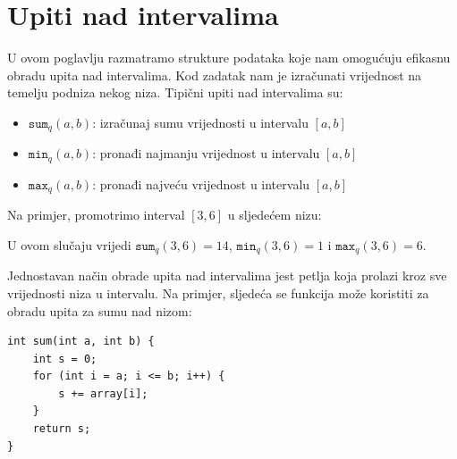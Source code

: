 \chapter{Upiti nad intervalima}


U ovom poglavlju razmatramo strukture podataka
koje nam omogućuju efikasnu obradu upita nad intervalima.
Kod 
zadatak nam je izračunati vrijednost
na temelju podniza nekog niza.
Tipični upiti nad intervalima su:
\begin{itemize}
\item $\texttt{sum}_q(a,b)$: izračunaj sumu vrijednosti u intervalu $[a,b]$
\item $\texttt{min}_q(a,b)$: pronađi najmanju vrijednost u intervalu $[a,b]$
\item $\texttt{max}_q(a,b)$: pronađi najveću vrijednost u intervalu $[a,b]$
\end{itemize}

Na primjer, promotrimo interval $[3,6]$ u sljedećem nizu:
\begin{center}
\end{center}
U ovom slučaju vrijedi $\texttt{sum}_q(3,6)=14$,
$\texttt{min}_q(3,6)=1$ i $\texttt{max}_q(3,6)=6$.

Jednostavan način obrade upita nad intervalima jest
petlja koja prolazi kroz sve vrijednosti niza u intervalu.
Na primjer, sljedeća se funkcija može
koristiti za obradu upita za sumu nad nizom:

\begin{lstlisting}
int sum(int a, int b) {
    int s = 0;
    for (int i = a; i <= b; i++) {
        s += array[i];
    }
    return s;
}
\end{lstlisting}

